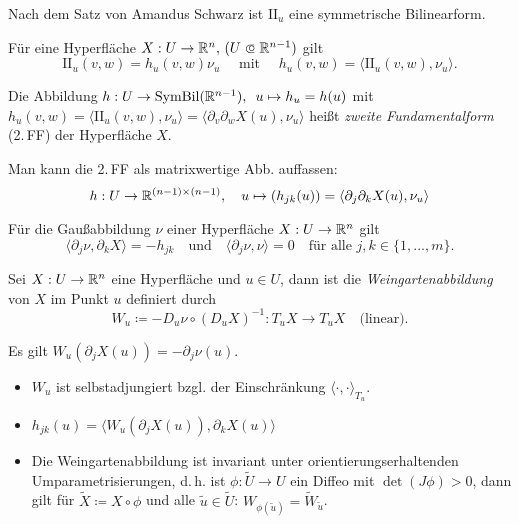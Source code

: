\documentclass{cheat-sheet}
\newcommand{\SymBil}{\mathrm{SymBil}} %
\newcommand{\FFII}{\mathrm{I\!I}} %
\begin{document}
\begin{bem}
  Nach dem Satz von Amandus Schwarz ist $\FFII_u$ eine symmetrische Bilinearform.
\end{bem}

\begin{bem}
  Für eine Hyperfläche $X : U \to \R^n, \, (U \opn \R^{n-1})$ gilt
  \[ \FFII_u(v, w) = h_u(v, w) \nu_u \quad \text{ mit } \quad h_u(v, w) = \langle \FFII_u(v, w) , \nu_u \rangle. \]
\end{bem}

\begin{defn} Die Abbildung \enspace $h : U \to \SymBil(\R^{n-1}), \enspace u \mapsto h_u = h(u)$
  mit $h_u(v, w) = \langle \FFII_u(v, w), \nu_u \rangle = \langle \partial_v \partial_w X(u), \nu_u \rangle$ heißt \emph{zweite Fundamentalform} (2.\,FF) der Hyperfläche $X$.
\end{defn}

\begin{bem}
  Man kann die 2.\,FF als matrixwertige Abb. auffassen:
  \[ h : U \to \mathbb{R}^{(n-1) \times (n-1)}, \quad u \mapsto (h_{jk}(u)) = \langle \partial_j \partial_k X(u), \nu_u \rangle \]
\end{bem}

\begin{satz}
  Für die Gaußabbildung $\nu$ einer Hyperfläche $X : U \to \mathbb{R}^n$ gilt
  \[
    \langle \partial_j \nu , \partial_k X \rangle = - h_{jk}
    \quad \text{und} \quad
    \langle \partial_j \nu, \nu \rangle = 0
    \quad \text{für alle } j, k \in \{ 1, ..., m \}.
  \]
\end{satz}

\begin{defn}
  Sei $X : U \to \mathbb{R}^n$ eine Hyperfläche und $u \in U$, dann ist die
  \emph{Weingartenabbildung} von $X$ im Punkt $u$ definiert durch
  \[
    W_u \coloneqq - D_u \nu \circ (D_u X)^{-1} : T_u X \to T_u X
    \quad \text{(linear).}
  \]
\end{defn}

\begin{bem}
  Es gilt $W_u(\partial_j X(u)) = - \partial_j \nu(u)$.
\end{bem}

\begin{satz}
  \begin{itemize}
    \item $W_u$ ist selbstadjungiert bzgl. der Einschränkung $\langle \cdot , \cdot \rangle_{T_u}$.
    \item $h_{jk}(u) = \langle W_u(\partial_j X(u)), \partial_k X(u) \rangle$
    \item Die Weingartenabbildung ist invariant unter orientierungserhaltenden Umparametrisierungen, d.\,h. ist $\phi : \tilde{U} \to U$ ein Diffeo mit $\det(J\phi) > 0$, dann gilt für $\tilde{X} \coloneqq X \circ \phi$ und alle $\tilde{u} \in \tilde{U}$: $W_{\phi(\tilde{u})} = \tilde{W}_{\tilde{u}}$.
  \end{itemize}
\end{satz}
\end{document}
